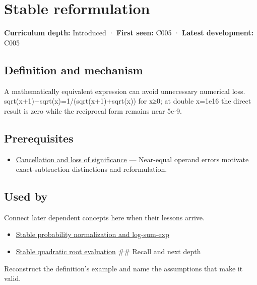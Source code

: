 \hypertarget{appendix-d7f8ba961670}{}\label{referencestart:appendix-d7f8ba961670}
\section{Stable reformulation}\label{appendix-d7f8ba961670-stable-reformulation}

\textbf{Curriculum depth:} Introduced · \textbf{First seen:} C005 · \textbf{Latest development:} C005

\subsection{Definition and mechanism}\label{appendix-d7f8ba961670-definition-and-mechanism}

A mathematically equivalent expression can avoid unnecessary numerical loss. sqrt(x+1)−sqrt(x)=1/(sqrt(x+1)+sqrt(x)) for x≥0; at double x=1e16 the direct result is zero while the reciprocal form remains near 5e-9.

\subsection{Prerequisites}\label{appendix-d7f8ba961670-prerequisites}

\begin{itemize}
\tightlist
\item
  \hyperref[appendix-a2773a6a2f9d]{Cancellation and loss of significance} --- Near-equal operand errors motivate exact-subtraction distinctions and reformulation.
\end{itemize}

\subsection{Used by}\label{appendix-d7f8ba961670-used-by}

Connect later dependent concepts here when their lessons arrive.

\begin{itemize}
\tightlist
\item
  \hyperref[appendix-d580b422240f]{Stable probability normalization and log-sum-exp}
\item
  \hyperref[appendix-b9afba7f63e5]{Stable quadratic root evaluation} \#\# Recall and next depth
\end{itemize}

Reconstruct the definition's example and name the assumptions that make it valid.

